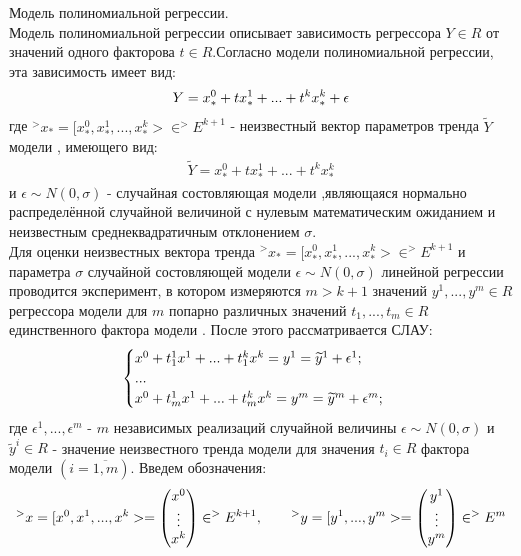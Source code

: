 \documentclass[__main__.tex]{subfiles}
\begin{document}
Модель полиномиальной регрессии.\\

Модель полиномиальной регрессии описывает зависимость регрессора $Y \in R$ от значений
одного факторова $t \in R$.Согласно модели полиномиальной регрессии, эта зависимость
имеет вид:
\begin{gather}
\llabel{10:1}
Y = x_*^0+tx_*^1+...+t^kx_*^k+\epsilon
\end{gather}
где $^>x_* = [x_*^0,x_*^1,...,x_*^k> \in ^>E^{k+1}$ - неизвестный вектор параметров тренда $\widetilde{Y}$ модели , имеющего вид:
\begin{gather}
\widetilde{Y} = x_*^0+tx_*^1+...+t^kx_*^k
\end{gather}
и $\epsilon \sim N(0,\sigma)$ - случайная состовляющая модели ,являющаяся нормально распределённой случайной величиной с нулевым математическим ожиданием и
неизвестным среднеквадратичным отклонением $\sigma$.\\
Для оценки неизвестных вектора тренда $^>x_*=[x_*^0,x_*^1,...,x_*^k> \in ^>E^{k+1}$ и параметра $\sigma$ случайной состовляющей модели $\epsilon \sim N(0,\sigma)$ линейной регрессии  проводится эксперимент, в котором измеряются $m>k+1$ значений $y^1,...,y^m \in R$ регрессора модели  для $m$ попарно различных значений $t_1,...,t_m \in R$ единственного фактора модели . После этого рассматривается СЛАУ:
\begin{gather}
\llabel{10:2}
\begin{cases}
x^0+t_1^1x^1+...+t_1^kx^k = y^1 = \widetilde{y}^1 +\epsilon^1;\\
...\\
x^0+t_m^1x^1+...+t_m^kx^k = y^m = \widetilde{y}^m +\epsilon^m;
\end{cases}
\end{gather}
где $\epsilon^1,...,\epsilon^m$ - $m$ независимых реализаций случайной величины $\epsilon \sim N(0,\sigma)$ и $\widetilde{y}^i \in R$ - значение неизвестного тренда модели для значения $t_i \in R$ фактора модели  $(i= \overline{1,m})$. Введем обозначения:
\begin{gather}
\llabel{10:3}
^>x = [x^0,x^1,...,x^k> = \begin{pmatrix}
x^0\\
\vdots\\
x^k
\end{pmatrix} \in ^>E^{k+1},
\qquad 
^>y=[y^1,...,y^m> = \begin{pmatrix}
y^1\\
\vdots\\
y^m
\end{pmatrix} \in ^>E^m
\end{gather}
\end{document}
